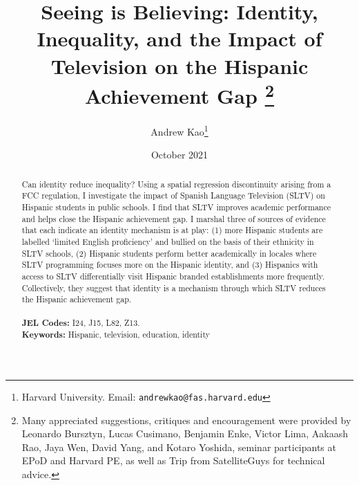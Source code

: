 \documentclass[11pt]{article}
\begin{document}
\title{\textbf{Seeing is Believing: Identity, Inequality, and the Impact of Television on the Hispanic Achievement Gap}%
\thanks{Many appreciated suggestions, critiques and encouragement were provided by Leonardo Bursztyn, Lucas Cusimano, Benjamin Enke, Victor Lima, Aakaash Rao, Jaya Wen, David Yang, and Kotaro Yoshida, seminar participants at EPoD and Harvard PE, as well as Trip from SatelliteGuys for technical advice. }\\
}



\author{Andrew Kao\thanks{Harvard University. Email: \texttt{andrewkao@fas.harvard.edu}} }

\date{October 2021}
{\vspace{-5ex}}


\maketitle

\begin{abstract}
\noindent  Can identity reduce inequality? Using a spatial regression discontinuity arising from a FCC regulation, I investigate the impact of Spanish Language Television (SLTV) on Hispanic students in public schools. I find that SLTV improves academic performance and helps close the Hispanic achievement gap. I marshal three of sources of evidence that each indicate an identity mechanism is at play: (1) more Hispanic students are labelled `limited English proficiency' and bullied on the basis of their ethnicity in SLTV schools, (2) Hispanic students perform better academically in locales where SLTV programming focuses more on the Hispanic identity, and (3) Hispanics with access to SLTV differentially visit Hispanic branded establishments more frequently. Collectively, they suggest that identity is a mechanism through which SLTV reduces the Hispanic achievement gap.\\\\
\textbf{JEL Codes:} I24, J15, L82, Z13.\\
\textbf{Keywords:} Hispanic, television, education, identity
\end{abstract}




\newsavebox{\tablebox} \newlength{\tableboxwidth}

\setlength{\baselineskip}{22pt}

\renewcommand{\thefootnote}{\fnsymbol{footnote}}
\end{document}
